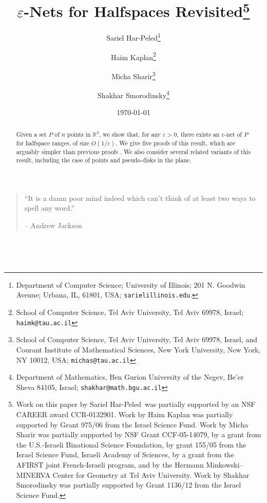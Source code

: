 \documentclass[12pt]{article}
\newcommand{\eps}{{\varepsilon}}
\newcommand{\reals}{{\mathbb R}}
\newcommand{\atgen}{\symbol{'100}}
\newcommand{\SarielThanks}[1]{\thanks{Department of Computer Science;
      University of Illinois; 201 N. Goodwin Avenue; Urbana, IL,
      61801, USA; {\tt sariel\atgen{}illinois.edu}.} #1}
\newcommand{\si}[1]{#1}
\begin{document}
\title{$\eps$-Nets for Halfspaces Revisited\thanks{Work on this paper by Sariel Har-Peled~was partially supported
      by an NSF CAREER award CCR-0132901.  Work by Haim Kaplan was
      partially supported by Grant 975/06 from the Israel Science
      Fund. Work by Micha Sharir was partially supported by NSF Grant
      CCF-05-14079, by a grant from the U.S.-Israeli Binational
      Science Foundation, by grant 155/05 from the Israel Science
      Fund, Israeli Academy of Sciences, by a grant from the
      \si{AFIRST} joint French-Israeli program, and by the Hermann
      Minkowski--MINERVA Center for Geometry at Tel Aviv University. Work by Shakhar Smorodinsky was
      partially supported by Grant 1136/12 from the Israel Science
      Fund.}}

\author{
Sariel Har-Peled\SarielThanks{}\and Haim Kaplan\thanks{School of Computer Science, Tel Aviv University, Tel Aviv 69978,
      Israel; \texttt{haimk@tau.ac.il} }\and Micha Sharir\thanks{School of Computer Science, Tel Aviv University, Tel Aviv 69978,
      Israel, and Courant Institute of Mathematical Sciences, New York
      University, New York, NY 10012, USA; \texttt{michas@tau.ac.il} }
   \and Shakhar Smorodinsky\thanks{Department of Mathematics, Ben Gurion University of the Negev,
      Be'er Sheva 84105, Israel; \texttt{shakhar@math.bgu.ac.il} } }

\date{\today}

\maketitle


\begin{center}
    \begin{minipage}[c]{5.0in}
        \footnotesize
        \begin{quotation}
            ``It is a damn poor mind indeed which can't think of
            at least two ways to spell any word.''


            \qquad\qquad\qquad -- \textrm{Andrew Jackson}
        \end{quotation}

        ~

        ~

    \end{minipage}
\end{center}


\begin{abstract}
    Given a set $P$ of $n$ points in $\reals^3$, we show that, for any
    $\eps >0$, there exists an $\eps$-net of $P$ for halfspace ranges,
    of size $O(1/\eps)$. We give five proofs of this result, which are
    arguably simpler than previous proofs \cite{msw-hnlls-90,
       cv-iaags-07, pr-nepen-08}.  We also consider several related
    variants of this result, including the case of points and
    pseudo-disks in the plane.
\end{abstract}
\end{document}
